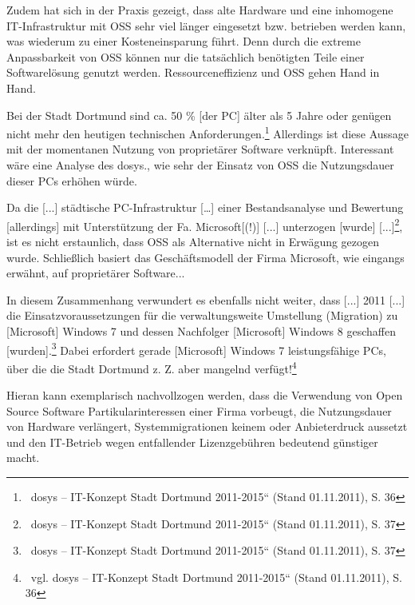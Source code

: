 \documentclass[a4paper]{article}
\begin{document}
{
Zudem hat sich in der Praxis gezeigt, dass alte Hardware und eine
inhomogene IT-Infrastruktur mit OSS sehr viel l\"anger eingesetzt bzw.
betrieben werden kann, was wiederum zu einer Kosteneinsparung f\"uhrt.
Denn durch die extreme Anpassbarkeit von OSS k\"onnen nur die
tats\"achlich ben\"otigten Teile einer Softwarel\"osung genutzt werden.
Ressourceneffizienz und OSS gehen Hand in Hand.}


\bigskip

{
Bei der Stadt Dortmund sind {\guillemotright}ca. 50 \% [der PC] \"alter
als 5 Jahre oder gen\"ugen nicht mehr den heutigen technischen
Anforderungen{\guillemotleft}.\footnote{\ dosys --
{\quotedblbase}IT-Konzept Stadt Dortmund 2011-2015{\textquotedblleft}
(Stand 01.11.2011), S. 36} Allerdings ist diese Aussage mit der
momentanen Nutzung von propriet\"arer Software verkn\"upft. Interessant
w\"are eine Analyse des dosys., wie sehr der Einsatz von OSS die
Nutzungsdauer dieser PCs erh\"ohen w\"urde.}

{
Da die {\guillemotright} [...] st\"adtische PC-Infrastruktur [{\dots}]
einer Bestandsanalyse und Bewertung [allerdings] mit Unterst\"utzung
der Fa. Microsoft[(!)] [...] unterzogen [wurde]
[...]{\guillemotleft}\footnote{\ dosys -- {\quotedblbase}IT-Konzept
Stadt Dortmund 2011-2015{\textquotedblleft} (Stand 01.11.2011), S. 37},
ist es nicht erstaunlich, dass OSS als Alternative nicht in Erw\"agung
gezogen wurde. Schlie{\ss}lich basiert das Gesch\"aftsmodell der Firma
Microsoft, wie eingangs erw\"ahnt, auf propriet\"arer Software...}

{
In diesem Zusammenhang verwundert es ebenfalls nicht weiter, dass
{\guillemotright} [...] 2011 [...] die Einsatzvoraussetzungen f\"ur die
verwaltungsweite Umstellung (Migration) zu [Microsoft] Windows 7 und
dessen Nachfolger [Microsoft] Windows 8 geschaffen
[wurden].{\guillemotleft}\footnote{\ dosys -- {\quotedblbase}IT-Konzept
Stadt Dortmund 2011-2015{\textquotedblleft} (Stand 01.11.2011), S. 37}
Dabei erfordert gerade [Microsoft] Windows 7 leistungsf\"ahige PCs,
\"uber die die Stadt Dortmund z. Z. aber mangelnd
verf\"ugt!\footnote{\ vgl. dosys -- {\quotedblbase}IT-Konzept Stadt
Dortmund 2011-2015{\textquotedblleft} (Stand 01.11.2011), S. 36}}

{
Hieran kann exemplarisch nachvollzogen werden, dass die Verwendung von
Open Source Software Partikularinteressen einer Firma vorbeugt, die
Nutzungsdauer von Hardware verl\"angert, Systemmigrationen keinem oder
Anbieterdruck aussetzt und den IT-Betrieb wegen entfallender
Lizenzgeb\"uhren bedeutend g\"unstiger macht.}
\end{document}

